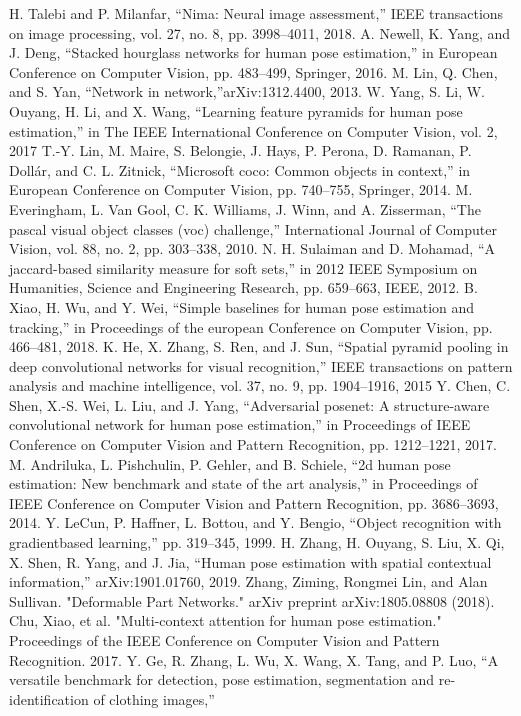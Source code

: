 \documentclass[conference]{IEEEtran}
\begin{document}
\begin{thebibliography}{00}
H. Talebi and P. Milanfar, “Nima: Neural image assessment,” IEEE transactions
on image processing, vol. 27, no. 8, pp. 3998–4011, 2018.
 A. Newell, K. Yang, and J. Deng, “Stacked hourglass networks for human pose
estimation,” in European Conference on Computer Vision, pp. 483–499, Springer,
2016.
M. Lin, Q. Chen, and S. Yan, “Network in network,”arXiv:1312.4400, 2013.
W. Yang, S. Li, W. Ouyang, H. Li, and X. Wang, “Learning feature pyramids for human pose estimation,” in The IEEE International Conference on Computer Vision, vol. 2, 2017
T.-Y. Lin, M. Maire, S. Belongie, J. Hays, P. Perona, D. Ramanan, P. Dollár, and C. L. Zitnick, “Microsoft coco: Common objects in context,” in European Conference on Computer Vision, pp. 740–755, Springer, 2014.
M. Everingham, L. Van Gool, C. K. Williams, J. Winn, and A. Zisserman, “The pascal visual object classes (voc) challenge,” International Journal of Computer Vision, vol. 88, no. 2, pp. 303–338, 2010.
N. H. Sulaiman and D. Mohamad, “A jaccard-based similarity measure for soft sets,” in 2012 IEEE Symposium on Humanities, Science and Engineering Research, pp. 659–663, IEEE, 2012.
B. Xiao, H. Wu, and Y. Wei, “Simple baselines for human pose estimation and tracking,” in Proceedings of the european Conference on Computer Vision, pp. 466–481, 2018.
K. He, X. Zhang, S. Ren, and J. Sun, “Spatial pyramid pooling in deep convolutional networks for visual recognition,” IEEE transactions on pattern analysis and machine intelligence, vol. 37, no. 9, pp. 1904–1916, 2015
Y. Chen, C. Shen, X.-S. Wei, L. Liu, and J. Yang, “Adversarial posenet: A structure-aware convolutional network for human pose estimation,” in Proceedings of IEEE Conference on Computer Vision and Pattern Recognition, pp. 1212–1221, 2017.
 M. Andriluka, L. Pishchulin, P. Gehler, and B. Schiele, “2d human pose estimation:
New benchmark and state of the art analysis,” in Proceedings of IEEE Conference
on Computer Vision and Pattern Recognition, pp. 3686–3693, 2014.
Y. LeCun, P. Haffner, L. Bottou, and Y. Bengio, “Object recognition with gradientbased learning,” pp. 319–345, 1999.
 H. Zhang, H. Ouyang, S. Liu, X. Qi, X. Shen, R. Yang, and J. Jia, “Human pose
estimation with spatial contextual information,” arXiv:1901.01760, 2019.
 Zhang, Ziming, Rongmei Lin, and Alan Sullivan. "Deformable Part Networks." arXiv preprint arXiv:1805.08808 (2018).
Chu, Xiao, et al. "Multi-context attention for human pose estimation." Proceedings of the IEEE Conference on Computer Vision and Pattern Recognition. 2017.
Y. Ge, R. Zhang, L. Wu, X. Wang, X. Tang, and P. Luo, “A versatile benchmark for detection, pose estimation, segmentation and re-identification of clothing images,”

\end{thebibliography}
\vspace{12pt}
\end{document}
